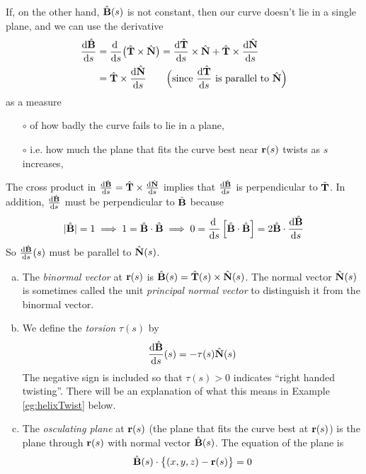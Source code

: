 If, on the other hand, $\hat{\mathbf{B}}(s)$ is not constant, then our curve 
doesn't lie  in a single plane, and we can use the derivative
\begin{align*}
\diff{\hat\vB}{s}
&=\diff{ }{s}\big(\hat\vT\times\hat\vN\big)
=\diff{\hat\vT}{s}\times\hat\vN + \hat\vT\times \diff{\hat\vN}{s} \\
&=\hat\vT\times \diff{\hat\vN}{s}\qquad
\text{$\Big($since $\diff{\hat\vT}{s}$ is parallel to $\hat\vN$$\Big)$}
\end{align*} 
as a measure
\begin{itemize}\itemsep1pt \parskip0pt  \itemindent 15pt
\item[$\circ$]
of how badly the curve fails to lie in a plane, 
\item[$\circ$] i.e. how much the
plane that fits the curve best near $\mathbf{r}(s)$ twists as $s$ increases,
\end{itemize}
The cross product in $\diff{\hat\vB}{s}=\hat\vT\times \diff{\hat\vN}{s}$ 
implies that $\diff{\hat\vB}{s}$ is perpendicular to $\hat{\mathbf{T}}$. In addition,
$\diff{\hat\vB}{s}$ must be perpendicular to $\hat{\mathbf{B}}$ because
\begin{equation*}
|\hat\vB|=1
\implies 1=\hat\vB\cdot\hat\vB
\implies 0 = \diff{}{s}\left[\hat\vB\cdot\hat\vB\right]
          = 2 \hat\vB\cdot\diff{\hat\vB}{s}
\end{equation*}
So $\diff{\hat\vB}{s}(s)$ must be parallel to $\hat{\mathbf{N}}(s)$.

\begin{defn}\label{def:torsion}
\begin{enumerate}[(a)]
\item The \emph{binormal vector} at $\mathbf{r}(s)$ is 
$\hat{\mathbf{B}}(s) = \hat{\mathbf{T}}(s)\times \hat{\mathbf{N}}(s)$. 
The normal vector $\hat{\mathbf{N}}(s)$ is sometimes called the unit
\emph{principal normal vector} to distinguish it from the
binormal vector.

\item
 We define the \emph{torsion}
$\tau(s)$ by
\begin{equation*}
\diff{\hat\vB}{s}(s) = -\tau(s)\hat\vN(s)
\end{equation*}
The negative sign is included so that $\tau(s)>0$ indicates
``right handed twisting''. There will be an explanation of what this means in Example \ref{eg:helixTwist} below.
\item
The \emph{osculating plane} at $\mathbf{r}(s)$ (the plane that fits the curve best 
at $\mathbf{r}(s)$) is the plane through $\mathbf{r}(s)$ with normal vector $\hat{\mathbf{B}}(s)$.
The equation of the plane is
\begin{equation*}
\hat{\mathbf{B}}(s)\cdot\big\{(x,y,z)-\mathbf{r}(s)\big\}=0
\end{equation*}
\end{enumerate}
\end{defn}

